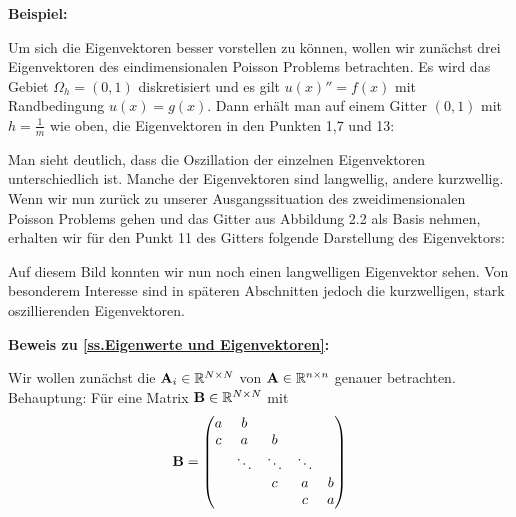 \textbf{Beispiel:}

Um sich die Eigenvektoren besser vorstellen zu können, wollen wir zunächst drei Eigenvektoren des eindimensionalen Poisson Problems betrachten. Es wird das Gebiet $\Omega_{h} = (0,1)$ diskretisiert und es gilt $u(x)'' = f(x)$ mit Randbedingung $u(x) = g(x)$. Dann erhält man auf einem Gitter $(0,1)$ mit $h = \frac{1}{m}$ wie oben, die Eigenvektoren in den Punkten 1,7 und 13:

\label{img.1D Langwelle}



Man sieht deutlich, dass die Oszillation der einzelnen Eigenvektoren unterschiedlich ist. Manche der Eigenvektoren sind langwellig, andere kurzwellig. Wenn wir nun zurück zu unserer Ausgangssituation des zweidimensionalen Poisson Problems gehen und das Gitter aus Abbildung 2.2 als Basis nehmen, erhalten wir für den Punkt 11 des Gitters folgende Darstellung des Eigenvektors:


Auf diesem Bild konnten wir nun noch einen langwelligen Eigenvektor sehen. Von besonderem Interesse sind in späteren Abschnitten jedoch die kurzwelligen, stark oszillierenden Eigenvektoren.

\textbf{Beweis zu \autoref{ss.Eigenwerte und Eigenvektoren}:}

Wir wollen zunächst die ${\textbf{A}}_{i} \in \mathbb{R}^{N \times N}$ von ${\textbf{A}} \in \mathbb{R}^{n \times n}$ genauer betrachten.\\
Behauptung: Für eine Matrix ${\textbf{B}} \in \mathbb{R}^{N \times N}$ mit
\begin{equation}
{\textbf{B}} = 
\begin{pmatrix}
a & b\\
c & a & b\\
  & \ddots & \ddots & \ddots\\
  &		   & c & a & b\\
  &		   &  & c & a
\end{pmatrix}
\end{equation}


